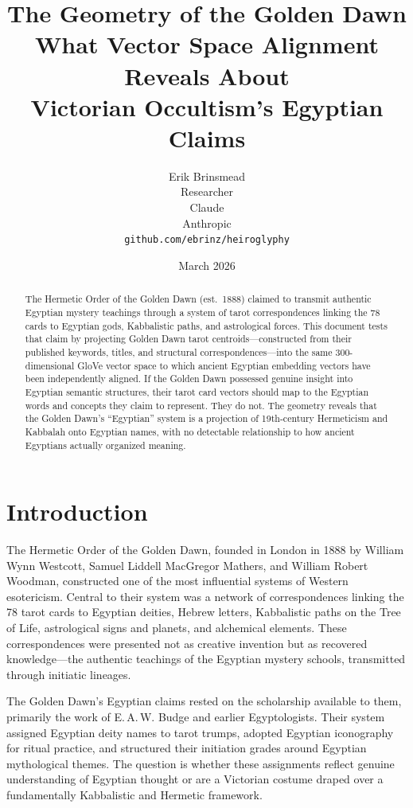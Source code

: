 \documentclass[11pt, a4paper]{article}
\title{
    \textbf{The Geometry of the Golden Dawn}\\[6pt]
    {\large What Vector Space Alignment Reveals About\\Victorian Occultism's Egyptian Claims}
}
\author{
    Erik Brinsmead \\
    Researcher \\[6pt]
    Claude \\
    Anthropic \\[12pt]
    \texttt{github.com/ebrinz/heiroglyphy}
}
\date{March 2026}
\begin{document}
\maketitle

\begin{abstract}
The Hermetic Order of the Golden Dawn (est.\ 1888) claimed to transmit authentic Egyptian mystery teachings through a system of tarot correspondences linking the 78 cards to Egyptian gods, Kabbalistic paths, and astrological forces. This document tests that claim by projecting Golden Dawn tarot centroids---constructed from their published keywords, titles, and structural correspondences---into the same 300-dimensional GloVe vector space to which ancient Egyptian embedding vectors have been independently aligned. If the Golden Dawn possessed genuine insight into Egyptian semantic structures, their tarot card vectors should map to the Egyptian words and concepts they claim to represent. They do not. The geometry reveals that the Golden Dawn's ``Egyptian'' system is a projection of 19th-century Hermeticism and Kabbalah onto Egyptian names, with no detectable relationship to how ancient Egyptians actually organized meaning.
\end{abstract}

\tableofcontents

\section{Introduction}

The Hermetic Order of the Golden Dawn, founded in London in 1888 by William Wynn Westcott, Samuel Liddell MacGregor Mathers, and William Robert Woodman, constructed one of the most influential systems of Western esotericism. Central to their system was a network of correspondences linking the 78 tarot cards to Egyptian deities, Hebrew letters, Kabbalistic paths on the Tree of Life, astrological signs and planets, and alchemical elements. These correspondences were presented not as creative invention but as recovered knowledge---the authentic teachings of the Egyptian mystery schools, transmitted through initiatic lineages.

The Golden Dawn's Egyptian claims rested on the scholarship available to them, primarily the work of E.\,A.\,W. Budge and earlier Egyptologists. Their system assigned Egyptian deity names to tarot trumps, adopted Egyptian iconography for ritual practice, and structured their initiation grades around Egyptian mythological themes. The question is whether these assignments reflect genuine understanding of Egyptian thought or are a Victorian costume draped over a fundamentally Kabbalistic and Hermetic framework.
\end{document}
